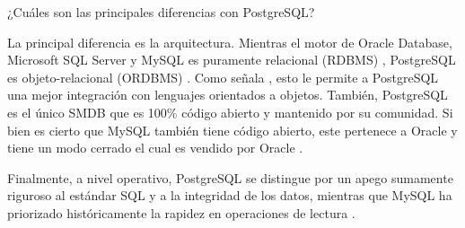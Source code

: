 \item ¿Cuáles son las principales diferencias con PostgreSQL?

La principal diferencia es la arquitectura. Mientras el motor de Oracle Database, Microsoft SQL Server y MySQL es puramente relacional (RDBMS) \parencite{microsoft_sf, oracle_sf}, PostgreSQL es objeto-relacional (ORDBMS) \parencite{postgresql_sf}. Como señala \textcite{tapia2023}, esto le permite a PostgreSQL una mejor integración con lenguajes orientados a objetos. También, PostgreSQL es el único SMDB que es 100\% código abierto y mantenido por su comunidad. Si bien es cierto que MySQL también tiene código abierto, este pertenece a Oracle y tiene un modo cerrado el cual es vendido por Oracle \parencite{oracle_sf}. 

Finalmente, a nivel operativo, PostgreSQL se distingue por un apego sumamente riguroso al estándar SQL y a la integridad de los datos, mientras que MySQL ha priorizado históricamente la rapidez en operaciones de lectura \parencite{oracle_sf}.
